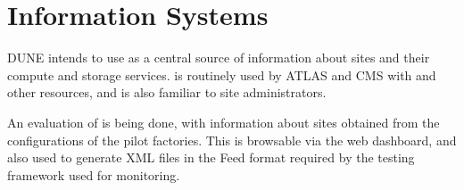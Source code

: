 \documentclass[../main-v1.tex]{subfiles}
\begin{document}
\chapter{Information Systems }
\label{ch:is}

DUNE intends to use   as a central source of information about sites and their compute and storage services.  is routinely used by ATLAS and CMS with  and other  resources, and is also familiar to site administrators. 

An evaluation of  is being done, with information about sites obtained from the configurations of the  pilot factories. This is browsable via the  web dashboard, and also used to generate XML files in the  Feed format required by the  testing framework used for monitoring.



\end{document}
